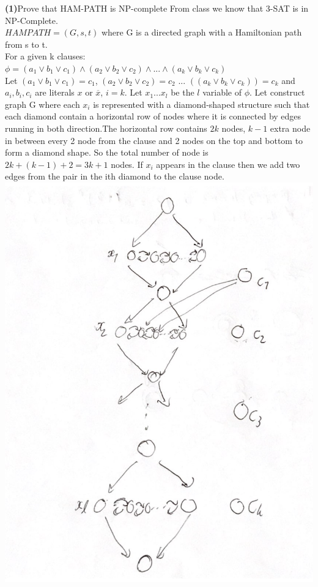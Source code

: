 \documentclass[a4paper, 11pt]{article}
\renewcommand{\part}[1] {\vspace{.10in} {\bf (#1)}}
\begin{document}
\part{1}{Prove that HAM-PATH is NP-complete}
From class we know that 3-SAT is in NP-Complete.\\
$HAMPATH = (G,s,t)$ where G is a directed graph with a Hamiltonian path from s to t.\\ 
For a given k clauses:\\
$\phi = (a_1 \lor b_1 \lor c_1) \land (a_2 \lor b_2 \lor c_2) \land ... \land (a_k \lor b_k \lor c_k)$\\
Let $(a_1 \lor b_1 \lor c_1) = c_1$, $(a_2 \lor b_2 \lor c_2) = c_2$ ... $((a_k \lor b_k \lor c_k)) = c_k$ and $a_i,b_i,c_i$ are literals $x$ or $\overline{x}$, $i=k$. Let $x_1 ... x_l$ be the $l$ variable of $\phi$. Let construct graph G where each $x_i$ is represented with a diamond-shaped structure such that each diamond contain a horizontal row of nodes where it is connected by edges running in both direction.The horizontal row contains $2k$ nodes,  $k-1$ extra node in between every 2 node from the clause and 2 nodes on the top and bottom to form a diamond shape. So the total number of node is $2k + (k-1) + 2 = 3k+1$ nodes. If $x_i$ appears in the clause then we add two edges from the pair in the ith diamond to the clause node. \\
\includegraphics[width=\textwidth]{Q4-1.png}\\
\end{document}
